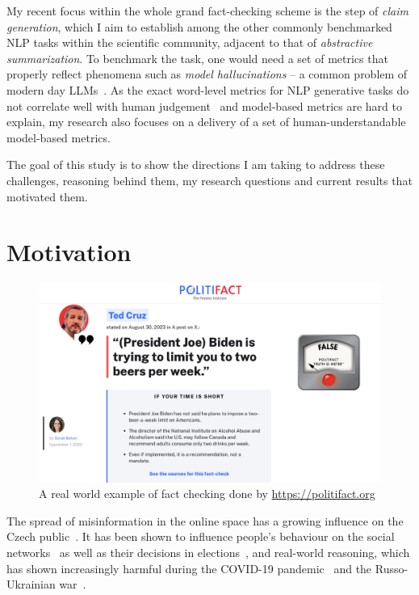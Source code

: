 My recent focus within the whole grand fact-checking scheme is the step of \textit{claim generation}, which I aim to establish among the other commonly benchmarked NLP tasks within the scientific community, adjacent to that of \textit{abstractive summarization}.
To benchmark the task, one would need a set of metrics that properly reflect phenomena such as \textit{model hallucinations} -- a common problem of modern day LLMs~\cite{Ji_2023}.
As the exact word-level metrics for NLP generative tasks do not correlate well with human judgement~\cite{bert-score} and model-based metrics are hard to explain, my research also focuses on a delivery of a set of human-understandable model-based metrics.

The goal of this study is to show the directions I am taking to address these challenges, reasoning behind them, my research questions and current results that motivated them.

\section{Motivation}
\label{sec:motivation}

\begin{figure}
    \includegraphics[width=14cm]{fig/politifact.pdf}
    \caption{A real world example of fact checking done by \url{https://politifact.org}}
    \label{fig:politifact}
\end{figure}

The spread of misinformation in the online space has a growing influence on the Czech public~\cite{stem}. It has been shown to influence people's behaviour on the social networks~\cite{Lazer1094} as well as their decisions in elections~\cite{10.1257/jep.31.2.211}, and real-world reasoning, which has shown increasingly harmful during the COVID-19 pandemic~\cite{BARUA2020100119} and the Russo-Ukrainian war~\cite{georgiana_stanescu_2022_6795674}.


